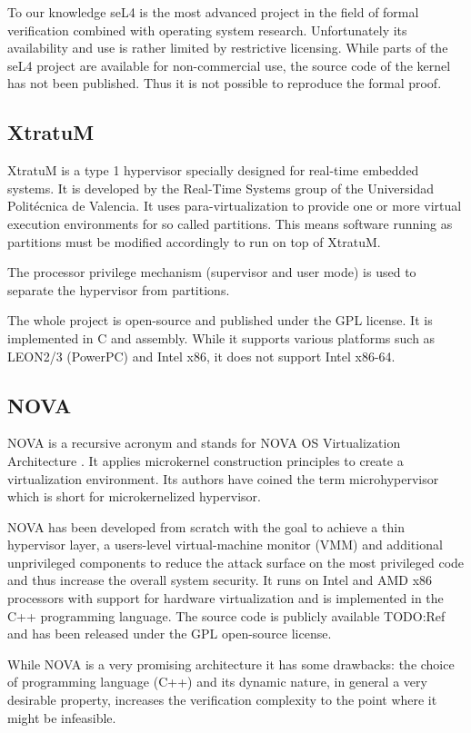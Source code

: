 To our knowledge seL4 is the most advanced project in the field of formal
verification combined with operating system research. Unfortunately its
availability and use is rather limited by restrictive licensing. While parts of
the seL4 project are available for non-commercial use, the source code of the
kernel has not been published. Thus it is not possible to reproduce the formal
proof.

\subsection{XtratuM}
XtratuM is a type 1 hypervisor specially designed for real-time embedded
systems. It is developed by the Real-Time Systems group of the Universidad
Politécnica de Valencia. It uses para-virtualization to provide one or more
virtual execution environments for so called partitions. This means software
running as partitions must be modified accordingly to run on top of XtratuM.

The processor privilege mechanism (supervisor and user mode) is used to
separate the hypervisor from partitions.

The whole project is open-source and published under the GPL license. It is
implemented in C and assembly. While it supports various platforms such as
LEON2/3 (PowerPC) and Intel x86, it does not support Intel x86-64.

\subsection{NOVA}
NOVA is a recursive acronym and stands for NOVA OS Virtualization Architecture
\cite{Steinberg:2010:NMS:1755913.1755935}. It applies microkernel construction
principles to create a virtualization environment. Its authors have coined
the term microhypervisor which is short for
microkernelized hypervisor.

NOVA has been developed from scratch with the goal to achieve a thin hypervisor
layer, a users-level virtual-machine monitor (VMM) and additional unprivileged
components to reduce the attack surface on the most privileged code and thus
increase the overall system security. It runs on Intel and AMD x86 processors
with support for hardware virtualization and is implemented in the C++
programming language. The source code is publicly available TODO:Ref and has
been released under the GPL open-source license.

While NOVA is a very promising architecture it has some drawbacks: the choice of
programming language (C++) and its dynamic nature, in general a very desirable
property, increases the verification complexity to the point where it might be
infeasible.

